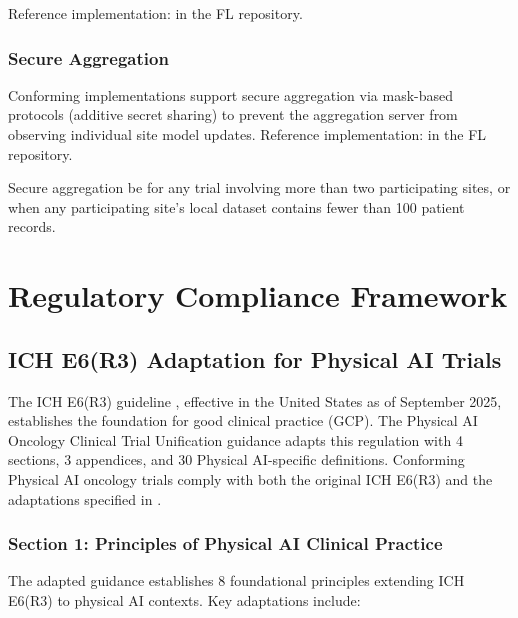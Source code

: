 \documentclass[11pt,letterpaper]{article}
\begin{document}
Reference implementation:  in the FL repository.

\subsubsection{Secure Aggregation}

Conforming implementations \SHOULD{} support secure aggregation via mask-based protocols (additive secret sharing) to prevent the aggregation server from observing individual site model updates. Reference implementation:  in the FL repository.

Secure aggregation \SHALL{} be \REQUIRED{} for any trial involving more than two participating sites, or when any participating site's local dataset contains fewer than 100 patient records.

\section{Regulatory Compliance Framework}
\label{sec:part3}

\subsection{ICH E6(R3) Adaptation for Physical AI Trials}

The ICH E6(R3) guideline \cite{ich2025e6r3}, effective in the United States as of September 2025, establishes the foundation for good clinical practice (GCP). The Physical AI Oncology Clinical Trial Unification guidance \cite{kawchak2026guidance} adapts this regulation with 4 sections, 3 appendices, and 30 Physical AI-specific definitions. Conforming Physical AI oncology trials \SHALL{} comply with both the original ICH E6(R3) and the adaptations specified in \cite{kawchak2026guidance}.

\subsubsection{Section 1: Principles of Physical AI Clinical Practice}

The adapted guidance establishes 8 foundational principles extending ICH E6(R3) to physical AI contexts. Key adaptations include:
\end{document}
